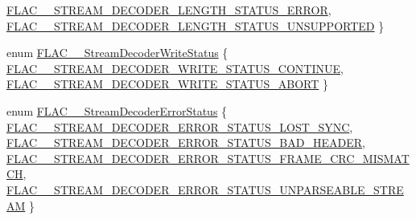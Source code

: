 \begin{DoxyCompactItemize}
\hyperlink{group__flac__stream__decoder_ggad5860157c2bb34501b8b9370472d727aab000e31c0c20c0d19df4f2203b01ea23}{F\+L\+A\+C\+\_\+\+\_\+\+S\+T\+R\+E\+A\+M\+\_\+\+D\+E\+C\+O\+D\+E\+R\+\_\+\+L\+E\+N\+G\+T\+H\+\_\+\+S\+T\+A\+T\+U\+S\+\_\+\+E\+R\+R\+OR}, 
\hyperlink{group__flac__stream__decoder_ggad5860157c2bb34501b8b9370472d727aae35949f46f887e6d826fe0fe4b2a32c1}{F\+L\+A\+C\+\_\+\+\_\+\+S\+T\+R\+E\+A\+M\+\_\+\+D\+E\+C\+O\+D\+E\+R\+\_\+\+L\+E\+N\+G\+T\+H\+\_\+\+S\+T\+A\+T\+U\+S\+\_\+\+U\+N\+S\+U\+P\+P\+O\+R\+T\+ED}
 \}
\item 
enum \hyperlink{group__flac__stream__decoder_ga73f67eb9e0ab57945afe038751bc62c8}{F\+L\+A\+C\+\_\+\+\_\+\+Stream\+Decoder\+Write\+Status} \{ \hyperlink{group__flac__stream__decoder_gga73f67eb9e0ab57945afe038751bc62c8acea48326e0ab8370d2814f4126fcb84e}{F\+L\+A\+C\+\_\+\+\_\+\+S\+T\+R\+E\+A\+M\+\_\+\+D\+E\+C\+O\+D\+E\+R\+\_\+\+W\+R\+I\+T\+E\+\_\+\+S\+T\+A\+T\+U\+S\+\_\+\+C\+O\+N\+T\+I\+N\+UE}, 
\hyperlink{group__flac__stream__decoder_gga73f67eb9e0ab57945afe038751bc62c8a23bd6bfec34af704e0d5ea273f14d95d}{F\+L\+A\+C\+\_\+\+\_\+\+S\+T\+R\+E\+A\+M\+\_\+\+D\+E\+C\+O\+D\+E\+R\+\_\+\+W\+R\+I\+T\+E\+\_\+\+S\+T\+A\+T\+U\+S\+\_\+\+A\+B\+O\+RT}
 \}
\item 
enum \hyperlink{group__flac__stream__decoder_ga130e70bd9a73d3c2416247a3e5132ecf}{F\+L\+A\+C\+\_\+\+\_\+\+Stream\+Decoder\+Error\+Status} \{ \hyperlink{group__flac__stream__decoder_gga130e70bd9a73d3c2416247a3e5132ecfa3ceec2a553dc142ad487ae88eb6f7222}{F\+L\+A\+C\+\_\+\+\_\+\+S\+T\+R\+E\+A\+M\+\_\+\+D\+E\+C\+O\+D\+E\+R\+\_\+\+E\+R\+R\+O\+R\+\_\+\+S\+T\+A\+T\+U\+S\+\_\+\+L\+O\+S\+T\+\_\+\+S\+Y\+NC}, 
\hyperlink{group__flac__stream__decoder_gga130e70bd9a73d3c2416247a3e5132ecfae393a9b91a6b2f23398675b5b57e1e86}{F\+L\+A\+C\+\_\+\+\_\+\+S\+T\+R\+E\+A\+M\+\_\+\+D\+E\+C\+O\+D\+E\+R\+\_\+\+E\+R\+R\+O\+R\+\_\+\+S\+T\+A\+T\+U\+S\+\_\+\+B\+A\+D\+\_\+\+H\+E\+A\+D\+ER}, 
\hyperlink{group__flac__stream__decoder_gga130e70bd9a73d3c2416247a3e5132ecfa208fe77a04e6ff684e50f0eae1214e26}{F\+L\+A\+C\+\_\+\+\_\+\+S\+T\+R\+E\+A\+M\+\_\+\+D\+E\+C\+O\+D\+E\+R\+\_\+\+E\+R\+R\+O\+R\+\_\+\+S\+T\+A\+T\+U\+S\+\_\+\+F\+R\+A\+M\+E\+\_\+\+C\+R\+C\+\_\+\+M\+I\+S\+M\+A\+T\+CH}, 
\hyperlink{group__flac__stream__decoder_gga130e70bd9a73d3c2416247a3e5132ecfa8b6864ad65edd8fea039838b6d3e5575}{F\+L\+A\+C\+\_\+\+\_\+\+S\+T\+R\+E\+A\+M\+\_\+\+D\+E\+C\+O\+D\+E\+R\+\_\+\+E\+R\+R\+O\+R\+\_\+\+S\+T\+A\+T\+U\+S\+\_\+\+U\+N\+P\+A\+R\+S\+E\+A\+B\+L\+E\+\_\+\+S\+T\+R\+E\+AM}
 \}
\end{DoxyCompactItemize}
